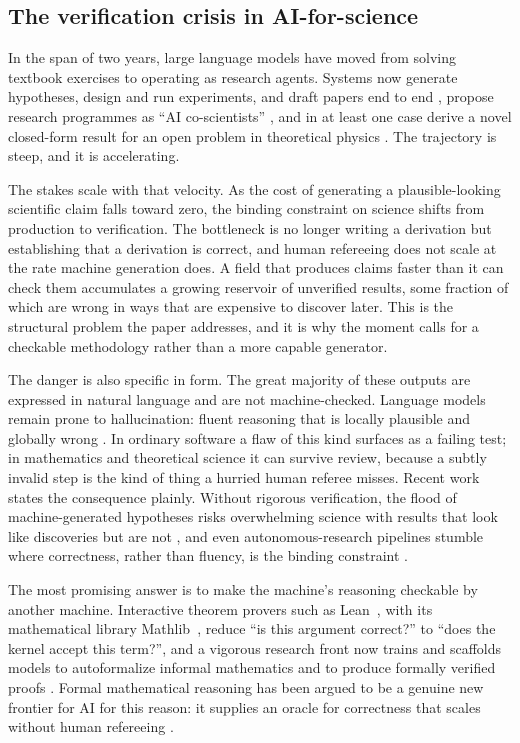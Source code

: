 \documentclass[11pt]{article}
\begin{document}
\subsection{The verification crisis in AI-for-science}

In the span of two years, large language models have moved from solving textbook exercises to
operating as research agents. Systems now generate hypotheses, design and run experiments, and
draft papers end to end \cite{r1,r2}, propose research programmes as ``AI co-scientists'' \cite{r3},
and in at least one case derive a novel closed-form result for an open problem in theoretical
physics \cite{r4}. The trajectory is steep, and it is accelerating.

The stakes scale with that velocity. As the cost of generating a plausible-looking scientific
claim falls toward zero, the binding constraint on science shifts from production to verification.
The bottleneck is no longer writing a derivation but establishing that a derivation is correct, and
human refereeing does not scale at the rate machine generation does. A field that produces claims
faster than it can check them accumulates a growing reservoir of unverified results, some fraction
of which are wrong in ways that are expensive to discover later. This is the structural problem the
paper addresses, and it is why the moment calls for a checkable methodology rather than a more
capable generator.

The danger is also specific in form. The great majority of these outputs are expressed in natural
language and are not machine-checked. Language models remain prone to hallucination: fluent
reasoning that is locally plausible and globally wrong \cite{r5}. In ordinary software a flaw of
this kind surfaces as a failing test; in mathematics and theoretical science it can survive review,
because a subtly invalid step is the kind of thing a hurried human referee misses. Recent work
states the consequence plainly. Without rigorous verification, the flood of machine-generated
hypotheses risks overwhelming science with results that look like discoveries but are not
\cite{r6}, and even autonomous-research pipelines stumble where correctness, rather than fluency,
is the binding constraint \cite{r7}.

The most promising answer is to make the machine's reasoning checkable by another machine.
Interactive theorem provers such as Lean~\cite{r38}, with its mathematical library Mathlib~\cite{r39},
reduce ``is this argument correct?'' to ``does the kernel accept this term?'', and a vigorous research front now
trains and scaffolds models to autoformalize informal mathematics and to produce formally verified
proofs \cite{r8,r9,r10}. Formal mathematical reasoning has been argued to be a genuine new frontier
for AI for this reason: it supplies an oracle for correctness that scales without human
refereeing \cite{r11}.
\end{document}
